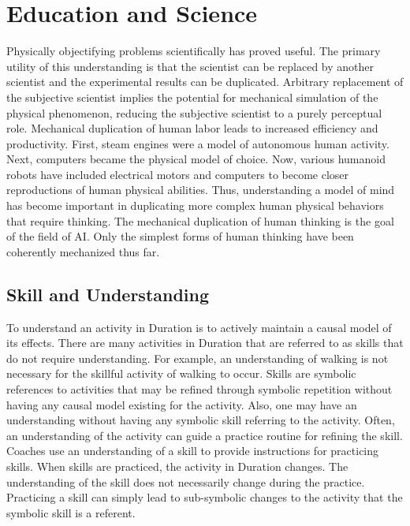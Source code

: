\chapter{Education and Science}
\label{chapter:education_and_science}

Physically objectifying problems scientifically has proved useful.
The primary utility of this understanding is that the scientist can be
replaced by another scientist and the experimental results can be
duplicated.  Arbitrary replacement of the subjective scientist implies
the potential for mechanical simulation of the physical phenomenon,
reducing the subjective scientist to a purely perceptual role.
Mechanical duplication of human labor leads to increased efficiency
and productivity.  First, steam engines were a model of autonomous
human activity.  Next, computers became the physical model of choice.
Now, various humanoid robots have included electrical motors and
computers to become closer reproductions of human physical abilities.
Thus, understanding a model of mind has become important in
duplicating more complex human physical behaviors that require
thinking.  The mechanical duplication of human thinking is the goal of
the field of AI.  Only the simplest forms of human thinking have been
coherently mechanized thus far.

\section{Skill and Understanding}

To understand an activity in Duration is to actively maintain a causal
model of its effects.  There are many activities in Duration that are
referred to as skills that do not require understanding.  For example,
an understanding of walking is not necessary for the skillful activity
of walking to occur.  Skills are symbolic references to activities
that may be refined through symbolic repetition without having any
causal model existing for the activity.  Also, one may have an
understanding without having any symbolic skill referring to the
activity.  Often, an understanding of the activity can guide a
practice routine for refining the skill.  Coaches use an understanding
of a skill to provide instructions for practicing skills.  When skills
are practiced, the activity in Duration changes.  The understanding of
the skill does not necessarily change during the practice.  Practicing
a skill can simply lead to sub-symbolic changes to the activity that
the symbolic skill is a referent.

